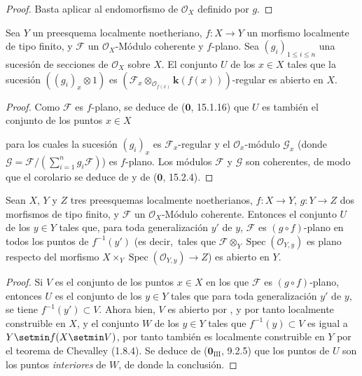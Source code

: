 \begin{proof}
Basta aplicar  al endomorfismo de $\mathcal O_X$ definido por $g$.
\end{proof}

\begin{corollary}[11.1.4]
\label{IV.11.1.4}
Sea $Y$ un preesquema localmente noetheriano, $f:X\to Y$ un morfismo localmente de tipo finito, y $\mathcal F$ un $\mathcal O_X$-Módulo coherente y $f$-plano. Sea $(g_i)_{1\leq i\leq n}$ una sucesión de secciones de $\mathcal O_X$ sobre $X$. El conjunto $U$ de los $x\in X$ tales que la sucesión $((g_i)_x\otimes1)$ es $(\mathcal F_x\otimes_{\mathcal O_{f(x)}}\boldsymbol{k}(f(x)))$-regular es abierto en $X$.
\end{corollary}

\begin{proof}

Como $\mathcal F$ es $f$-plano, se deduce de
($\mathbf 0$, 15.1.16) que $U$ es también el conjunto de los puntos
$x\in X$


 para los cuales la sucesión $(g_i)_x$ es
$\mathcal F_x$-regular y el $\mathcal O_x$-módulo
$\mathcal G_x$ (donde $\mathcal G=\mathcal F/(\sum_{i=1}^n g_i\mathcal F)$)
es $f$-plano. Los módulos $\mathcal F$ y $\mathcal G$ son coherentes, de modo que el
corolario se deduce de  y de
($\mathbf 0$, 15.2.4).
\end{proof}

\begin{corollary}[11.1.5]
\label{IV.11.1.5}
Sean $X$, $Y$ y $Z$ tres preesquemas localmente noetherianos, $f:X\to Y$, $g:Y\to Z$ dos morfismos de tipo finito, y $\mathcal F$ un $\mathcal O_X$-Módulo coherente. Entonces el conjunto $U$ de los $y\in Y$ tales que, para toda generalización $y'$ de $y$, $\mathcal F$ es $(g\circ f)$-plano en todos los puntos de $f^{-1}(y')$ \textup{(es decir,}\ tales que $\mathcal F\otimes_Y\operatorname{Spec}(\mathcal O_{Y,y})$ es plano respecto del morfismo $X\times_Y\operatorname{Spec}(\mathcal O_{Y,y})\to Z$\textup{)} es abierto en $Y$.
\end{corollary}

\begin{proof}
Si $V$ es el conjunto de los puntos $x\in X$ en los que $\mathcal F$ es
$(g\circ f)$-plano, entonces $U$ es el conjunto de los $y\in Y$ tales
que para toda generalización $y'$ de $y$, se tiene $f^{-1}(y')\subset V$.
Ahora bien, $V$ es abierto por , y por tanto localmente
construible en $X$, y el conjunto $W$ de los
$y\in Y$ tales que $f^{-1}(y)\subset V$ es
igual a $Y\setmin f(X\setmin V)$, por tanto también es localmente construible en $Y$ por el teorema de
Chevalley (1.8.4). Se deduce de
($\mathbf 0_{\mathrm{III}}$, 9.2.5) que los puntos de $U$ son
los puntos \emph{interiores} de $W$, de donde la conclusión.
\end{proof}

